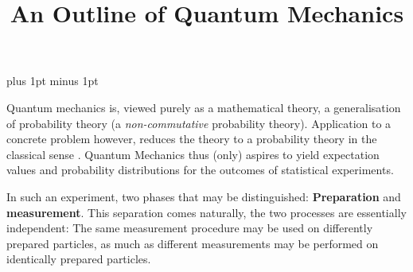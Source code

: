\documentclass[a4paper]{amsart}            %
\theoremstyle{plain}                                               %
\begin{document}

\title{An Outline of Quantum Mechanics}


\maketitle
\pagestyle{empty} %
\thispagestyle{empty}

\abovedisplayskip\bigskipamount
\belowdisplayskip \abovedisplayskip
\parskip 12pt plus 1pt minus 1pt


Quantum mechanics is, viewed purely as a mathematical theory, a generalisation of probability theory (a \emph{non-commutative} probability theory). Application to a concrete problem however, reduces the theory to a probability theory in the classical sense \mbox{\cite[p. 280]{qp}}. Quantum Mechanics thus (only) aspires to yield expectation values and probability distributions for the outcomes of statistical experiments. 

In such an experiment, two phases that may be distinguished: \textbf{Preparation} and \textbf{measurement}. This separation comes naturally, the two processes are essentially independent: The same measurement procedure may be used on differently prepared particles, as much as different measurements may be performed on identically prepared particles.

\bigskip
\end{document}
